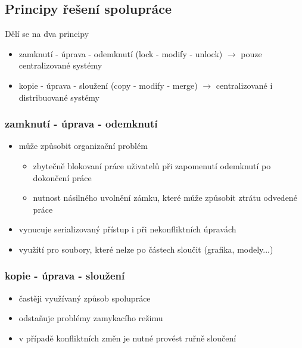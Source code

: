 \documentclass{szzclass}
\begin{document}
\subsection{Principy řešení spolupráce}
Dělí se na dva principy
\begin{itemize}
    \item zamknutí - úprava - odemknutí (lock - modify - unlock) $\rightarrow$ pouze centralizované systémy
    \item kopie - úprava - sloužení (copy - modify - merge) $\rightarrow$ centralizované i distribuované systémy
\end{itemize}
\subsubsection{zamknutí - úprava - odemknutí}
\begin{itemize}
    \item může způsobit organizační problém
    \begin{itemize}
        \item zbytečně blokovaní práce uživatelů při zapomenutí odemknutí po dokončení práce
        \item nutnost násilného uvolnění zámku, které může způsobit ztrátu odvedené práce
    \end{itemize}
    \item vynucuje serializovaný přístup i při nekonfliktních úpravách
    \item využítí pro soubory, které nelze po částech sloučit (grafika, modely...)
\end{itemize}
\subsubsection{kopie - úprava - sloužení}
\begin{itemize}
    \item častěji využívaný způsob spolupráce
    \item odstaňuje problémy zamykacího režimu
    \item v případě konfliktních změn je nutné provést ruřně sloučení
\end{itemize}
\end{document}
